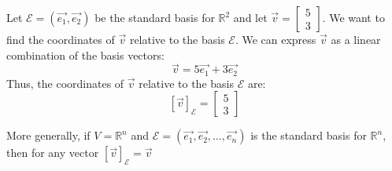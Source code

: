 \begin{eg}
    Let $\mathcal{E} = (\vec{e_1}, \vec{e_2})$ be the standard basis for $\mathbb{R}^2$ and let $\vec{v} = \begin{bmatrix}
        5 \\ 3
    \end{bmatrix}$. We want to find the coordinates of $\vec{v}$ relative to the basis $\mathcal{E}$. We can express $\vec{v}$ as a linear combination of the basis vectors:
    \[ \vec{v} = 5\vec{e_1} + 3\vec{e_2} \]
    Thus, the coordinates of $\vec{v}$ relative to the basis $\mathcal{E}$ are:
    \[ [\vec{v}]_{\mathcal{E}} = \begin{bmatrix}
        5 \\ 3
    \end{bmatrix} \]
\end{eg}
More generally, if $V = \mathbb{R}^n$ and $\mathcal{E} = (\vec{e_1}, \vec{e_2}, \ldots, \vec{e_n})$ is the standard basis for $\mathbb{R}^n$, then for any vector $[\vec{v}]_{\mathcal{E}} = \vec{v}$

